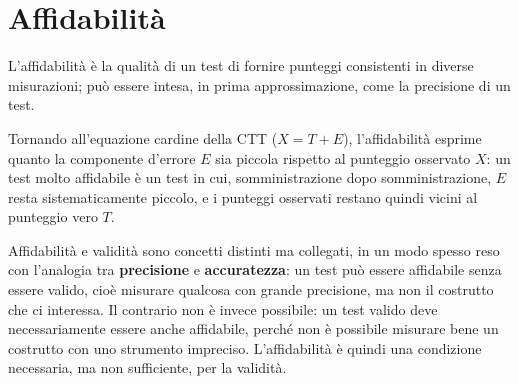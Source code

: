 \documentclass[
  italian,
  letterpaper,
  paper=6in:9in,
  pagesize=pdftex,
  headinclude=on,
  footinclude=on,
  11pt]{scrbook}
\begin{document}
\section{Affidabilità}\label{affidabilituxe0}

\begin{tcolorbox}[enhanced jigsaw, title=\textcolor{quarto-callout-note-color}{\faInfo}\hspace{0.5em}{Definizione}, coltitle=black, bottomtitle=1mm, colback=white, bottomrule=.15mm, rightrule=.15mm, breakable, toptitle=1mm, left=2mm, colbacktitle=quarto-callout-note-color!10!white, titlerule=0mm, colframe=quarto-callout-note-color-frame, leftrule=.75mm, opacitybacktitle=0.6, arc=.35mm, toprule=.15mm, opacityback=0]

L'affidabilità è la qualità di un test di fornire punteggi consistenti
in diverse misurazioni; può essere intesa, in prima approssimazione,
come la precisione di un test.

\end{tcolorbox}

Tornando all'equazione cardine della CTT (\(X = T + E\)), l'affidabilità
esprime quanto la componente d'errore \(E\) sia piccola rispetto al
punteggio osservato \(X\): un test molto affidabile è un test in cui,
somministrazione dopo somministrazione, \(E\) resta sistematicamente
piccolo, e i punteggi osservati restano quindi vicini al punteggio vero
\(T\).

Affidabilità e validità sono concetti distinti ma collegati, in un modo
spesso reso con l'analogia tra \textbf{precisione} e
\textbf{accuratezza}: un test può essere affidabile senza essere valido,
cioè misurare qualcosa con grande precisione, ma non il costrutto che ci
interessa. Il contrario non è invece possibile: un test valido deve
necessariamente essere anche affidabile, perché non è possibile misurare
bene un costrutto con uno strumento impreciso. L'affidabilità è quindi
una condizione necessaria, ma non sufficiente, per la validità.
\end{document}
